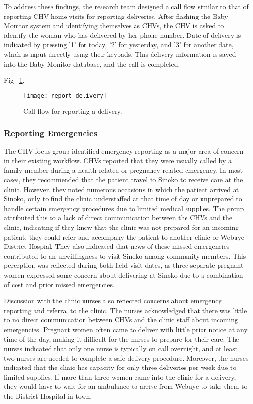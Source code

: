 To address these findings, the research team designed a call flow similar to that of reporting CHV home visits for reporting deliveries. After flashing the Baby Monitor system and identifying themselves as CHVs, the CHV is asked to identify the woman who has delivered by her phone number. Date of delivery is indicated by pressing '1' for today, '2' for yesterday, and '3' for another date, which is input directly using their keypads. This delivery information is saved into the Baby Monitor database, and the call is completed. 

Fig ~\ref{fig:delivery}.
\begin{figure}[]
	\begin{center}
	\texttt{[image: report-delivery]}
	\end{center}
	\caption{Call flow for reporting a delivery.}
	\label{fig:delivery}
\end{figure}

\subsubsection{Reporting Emergencies}
The CHV focus group identified emergency reporting as a major area of concern in their existing workflow. CHVs reported that they were usually called by a family member during a health-related or pregnancy-related emergency. In most cases, they recommended that the patient travel to Sinoko to receive care at the clinic. However, they noted numerous occasions in which the patient arrived at Sinoko, only to find the clinic understaffed at that time of day or unprepared to  handle certain emergency procedures due to limited medical supplies. The group attributed this to a lack of direct communication between the CHVs and the clinic, indicating if they knew that the clinic was not prepared for an incoming patient, they could refer and accompany the patient to another clinic or Webuye District Hospial. They also indicated that news of these missed emergencies contributed to an unwillingness to visit Sinoko among community members. This perception was reflected during both field visit dates, as three separate pregnant women expressed some concern about delivering at Sinoko due to a combination of cost and prior missed emergencies. 

Discussion with the clinic nurses also reflected concerns about emergency reporting and referral to the clinic. The nurses acknowledged that there was little to no direct communication between CHVs and the clinic staff about incoming emergencies. Pregnant women often came to deliver with little prior notice at any time of the day, making it difficult for the nurses to prepare for their care. The nurses indicated that only one nurse is typically on call overnight, and at least two nurses are needed to complete a safe delivery procedure. Moreover, the nurses indicated that the clinic has capacity for only three deliveries per week due to limited supplies. If more than three women came into the clinic for a delivery, they would have to wait for an ambulance to arrive from Webuye to take them to the District Hospital in town.

